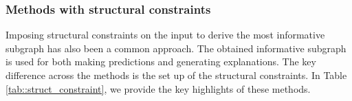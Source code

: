 \subsubsection{Methods with structural constraints}
\label{subsec:: SE- structural-constr}
Imposing structural constraints on the input to derive the most informative subgraph has also been a common approach. The obtained informative subgraph is used for both making predictions and generating explanations. The key difference across the methods is the set up of the structural constraints. In Table \ref{tab::struct_constraint}, we provide the key highlights of these methods.

